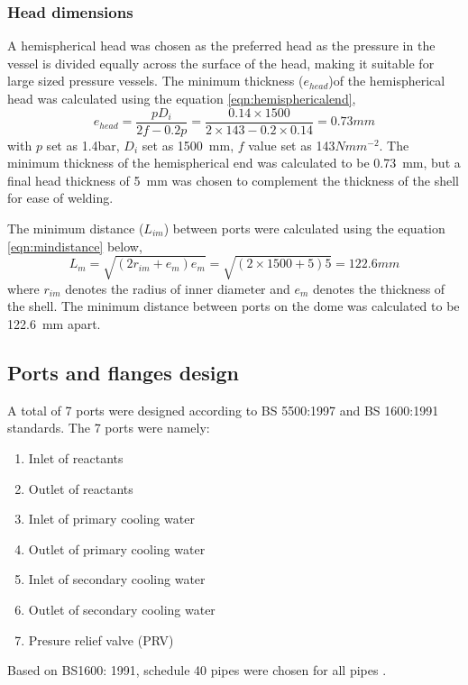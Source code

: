 \subsubsection{Head dimensions}
A hemispherical head was chosen as the preferred head as the pressure in the vessel is divided equally across the surface of the head, making it suitable for large sized pressure vessels. 
The minimum thickness ($e_{head}$)of the hemispherical head was calculated using the equation \ref{eqn:hemisphericalend},
\begin{equation}
    e_{head} = \frac{pD_i}{2f-0.2p} = \frac{0.14 \times 1500}{2 \times 143 - 0.2 \times 0.14} = 0.73mm
    \label{eqn:hemisphericalend}
\end{equation}
with $p$ set as 1.4bar, $D_i$ set as \SI{1500}{\milli \metre}, $f$ value set as 143$Nmm^{-2}$.  The minimum thickness of the hemispherical end was calculated to be \SI{0.73}{\milli \metre}, but a final head thickness of \SI{5}{\milli \metre} was chosen to complement the thickness of the shell for ease of welding. 

The minimum distance ($L_{im}$) between ports were calculated using the equation \ref{eqn:mindistance} below,
\begin{equation}
    L_m = \sqrt{(2r_{im}+e_{m})e_m} = \sqrt{(2 \times 1500 + 5)5} = 122.6mm
    \label{eqn:mindistance}
\end{equation}
where $r_{im}$ denotes the radius of inner diameter and $e_m$ denotes the thickness of the shell. The minimum distance between ports on the dome was calculated to be \SI{122.6}{\milli \metre} apart. 

\subsection{Ports and flanges design}
A total of 7 ports were designed according to BS 5500:1997 and BS 1600:1991 standards. The 7 ports were namely:
\begin{enumerate}
    \item Inlet of reactants
    \item Outlet of reactants
    \item Inlet of primary cooling water
    \item Outlet of primary cooling water
    \item Inlet of secondary cooling water
    \item Outlet of secondary cooling water
    \item Presure relief valve (PRV)
\end{enumerate}
Based on BS1600: 1991, schedule 40 pipes were chosen for all pipes \cite{noauthor_dimensions_nodate}. 
